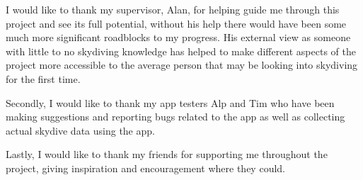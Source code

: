 \begin{acknowledgements}
  I would like to thank my supervisor, Alan, for helping guide me through this project and see its full potential, without his help there would have been some much more significant roadblocks to my progress. His external view as someone with little to no skydiving knowledge has helped to make different aspects of the project more accessible to the average person that may be looking into skydiving for the first time.

  Secondly, I would like to thank my app testers Alp and Tim who have been making suggestions and reporting bugs related to the app as well as collecting actual skydive data using the app.

  Lastly, I would like to thank my friends for supporting me throughout the project, giving inspiration and encouragement where they could.
\end{acknowledgements}

